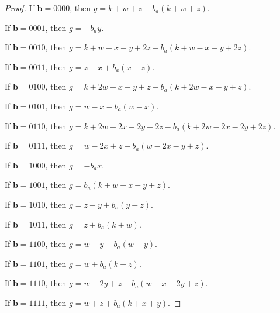 \documentclass[11pt]{scrartcl}
\newcommand{\vc}[1]{\boldsymbol{#1}}
\begin{document}
\begin{proof}
If $\vc b = 0000$, then $g = k + w + z - b_a(k + w + z)$.

If $\vc b = 0001$, then $g = -b_ay$.

If $\vc b = 0010$, then $g = k + w - x - y + 2z - b_a(k + w - x - y + 2z)$.

If $\vc b = 0011$, then $g = z - x + b_a(x - z)$.

If $\vc b = 0100$, then $g = k + 2w - x - y + z - b_a(k + 2w - x - y + z)$.

If $\vc b = 0101$, then $g = w - x - b_a(w - x)$.

If $\vc b = 0110$, then $g = k + 2w - 2x - 2y + 2z - b_a(k + 2w - 2x - 2y + 2z)$.

If $\vc b = 0111$, then $g = w - 2x + z - b_a(w - 2x - y + z)$.

If $\vc b = 1000$, then $g = -b_ax$.

If $\vc b = 1001$, then $g = b_a(k + w - x - y + z)$.

If $\vc b = 1010$, then $g = z - y + b_a(y - z)$.

If $\vc b = 1011$, then $g = z + b_a(k + w)$.

If $\vc b = 1100$, then $g = w - y - b_a(w - y)$.

If $\vc b = 1101$, then $g = w + b_a(k + z)$.

If $\vc b = 1110$, then $g = w - 2y + z - b_a(w - x - 2y + z)$.

If $\vc b = 1111$, then $g = w + z + b_a(k + x + y)$.

\end{proof}
\end{document}
